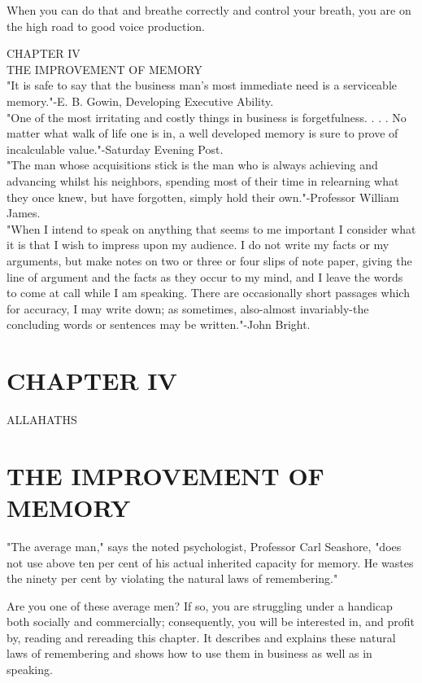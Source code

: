 \documentclass[10pt]{article}
\begin{document}
When you can do that and breathe correctly and control your breath, you are on the high road to good voice production.

CHAPTER IV\\
THE IMPROVEMENT OF MEMORY\\
"It is safe to say that the business man's most immediate need is a serviceable memory."-E. B. Gowin, Developing Executive Ability.\\
"One of the most irritating and costly things in business is forgetfulness. . . . No matter what walk of life one is in, a well developed memory is sure to prove of incalculable value."-Saturday Evening Post.\\
"The man whose acquisitions stick is the man who is always achieving and advancing whilst his neighbors, spending most of their time in relearning what they once knew, but have forgotten, simply hold their own."-Professor William James.\\
"When I intend to speak on anything that seems to me important I consider what it is that I wish to impress upon my audience. I do not write my facts or my arguments, but make notes on two or three or four slips of note paper, giving the line of argument and the facts as they occur to my mind, and I leave the words to come at call while I am speaking. There are occasionally short passages which for accuracy, I may write down; as sometimes, also-almost invariably-the concluding words or sentences may be written."-John Bright.

\section*{CHAPTER IV}
ALLAHATHS

\section*{THE IMPROVEMENT OF MEMORY}
"The average man," says the noted psychologist, Professor Carl Seashore, "does not use above ten per cent of his actual inherited capacity for memory. He wastes the ninety per cent by violating the natural laws of remembering."

Are you one of these average men? If so, you are struggling under a handicap both socially and commercially; consequently, you will be interested in, and profit by, reading and rereading this chapter. It describes and explains these natural laws of remembering and shows how to use them in business as well as in speaking.
\end{document}
